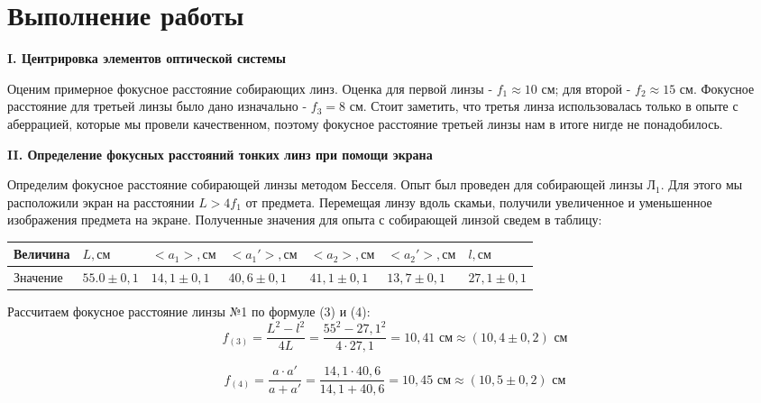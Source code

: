 \documentclass[a4paper,12pt]{report}
\begin{document}
\newpage
\section*{\huge{Выполнение работы}}

\noindent\textbf{I. Центрировка элементов оптической системы}

Оценим примерное фокусное расстояние собирающих линз. Оценка для первой линзы - $f_{1} \approx 10 $ см; для второй - $f_{2} \approx 15$ см. Фокусное расстояние для третьей линзы было дано изначально - $f_{3} = 8$ см. Стоит заметить, что третья линза использовалась только в опыте с аберрацией, которые мы провели качественном, поэтому фокусное расстояние третьей линзы нам в итоге нигде не понадобилось.

\vspace{\baselineskip}
\noindent\textbf{II. Определение фокусных расстояний тонких линз при помощи экрана}

Определим фокусное расстояние собирающей линзы методом Бесселя. Опыт был проведен для собирающей линзы $\text{Л}_{1}$. Для этого мы расположили экран на расстоянии $L >4f_{1}$ от предмета. Перемещая линзу вдоль скамьи, получили увеличенное и уменьшенное изображения предмета на экране. Полученные значения для опыта с собирающей линзой сведем в таблицу:

\begin{table}[h!]
\centering
\begin{tabular}{|l|l|l|l|l|l|l|}
\hline
Величина & $L, \text{см}$             & $<a_{1}>, \text{см}$            & $<a_{1}'>, \text{см}$           & $<a_{2}>, \text{см}$            & $<a_{2}'>, \text{см}$           & $l, \text{см}$             \\ \hline
Значение & $55.0\pm 0,1$ & $14,1\pm0,1 $ & $40,6\pm0,1 $ & $41,1\pm0,1 $ & $13,7\pm0,1 $ & $27,1\pm0,1 $ \\ \hline
\end{tabular}
\end{table}

Рассчитаем фокусное расстояние линзы №1 по формуле (3) и (4):
\begin{equation*}
    f_{(3)} = \frac{L^{2} - l^{2}}{4L} = \frac{55^{2} - 27,1^{2}}{4\cdot 27,1} = 10,41 \text{ см} \approx (10,4 \pm 0,2) \text{ см}
\end{equation*}

\begin{equation*}
    f_{(4)} = \frac{a\cdot a'}{a + a'} = \frac{14,1 \cdot 40,6}{14,1 + 40,6} = 10,45 \text{ см} \approx (10,5 \pm 0,2) \text{ см}
\end{equation*}
\end{document}
